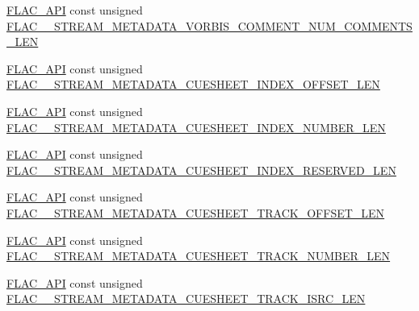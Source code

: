 \begin{DoxyCompactItemize}
\item 
\mbox{\hyperlink{group__flac__export_ga56ca07df8a23310707732b1c0007d6f5}{F\+L\+A\+C\+\_\+\+A\+PI}} const unsigned \mbox{\hyperlink{group__flac__format_gaa45c45967901bd6002d2a0ccbb208e02}{F\+L\+A\+C\+\_\+\+\_\+\+S\+T\+R\+E\+A\+M\+\_\+\+M\+E\+T\+A\+D\+A\+T\+A\+\_\+\+V\+O\+R\+B\+I\+S\+\_\+\+C\+O\+M\+M\+E\+N\+T\+\_\+\+N\+U\+M\+\_\+\+C\+O\+M\+M\+E\+N\+T\+S\+\_\+\+L\+EN}}
\item 
\mbox{\hyperlink{group__flac__export_ga56ca07df8a23310707732b1c0007d6f5}{F\+L\+A\+C\+\_\+\+A\+PI}} const unsigned \mbox{\hyperlink{group__flac__format_ga6579eee01a62ce96e3e243e3bd1ec478}{F\+L\+A\+C\+\_\+\+\_\+\+S\+T\+R\+E\+A\+M\+\_\+\+M\+E\+T\+A\+D\+A\+T\+A\+\_\+\+C\+U\+E\+S\+H\+E\+E\+T\+\_\+\+I\+N\+D\+E\+X\+\_\+\+O\+F\+F\+S\+E\+T\+\_\+\+L\+EN}}
\item 
\mbox{\hyperlink{group__flac__export_ga56ca07df8a23310707732b1c0007d6f5}{F\+L\+A\+C\+\_\+\+A\+PI}} const unsigned \mbox{\hyperlink{group__flac__format_ga1cbe4b28f16dd566feb74782f2728b0e}{F\+L\+A\+C\+\_\+\+\_\+\+S\+T\+R\+E\+A\+M\+\_\+\+M\+E\+T\+A\+D\+A\+T\+A\+\_\+\+C\+U\+E\+S\+H\+E\+E\+T\+\_\+\+I\+N\+D\+E\+X\+\_\+\+N\+U\+M\+B\+E\+R\+\_\+\+L\+EN}}
\item 
\mbox{\hyperlink{group__flac__export_ga56ca07df8a23310707732b1c0007d6f5}{F\+L\+A\+C\+\_\+\+A\+PI}} const unsigned \mbox{\hyperlink{group__flac__format_gaa3266be1c92182925c0d02c660617feb}{F\+L\+A\+C\+\_\+\+\_\+\+S\+T\+R\+E\+A\+M\+\_\+\+M\+E\+T\+A\+D\+A\+T\+A\+\_\+\+C\+U\+E\+S\+H\+E\+E\+T\+\_\+\+I\+N\+D\+E\+X\+\_\+\+R\+E\+S\+E\+R\+V\+E\+D\+\_\+\+L\+EN}}
\item 
\mbox{\hyperlink{group__flac__export_ga56ca07df8a23310707732b1c0007d6f5}{F\+L\+A\+C\+\_\+\+A\+PI}} const unsigned \mbox{\hyperlink{group__flac__format_ga2998481389f82ac8ec3c8aa1e405fb56}{F\+L\+A\+C\+\_\+\+\_\+\+S\+T\+R\+E\+A\+M\+\_\+\+M\+E\+T\+A\+D\+A\+T\+A\+\_\+\+C\+U\+E\+S\+H\+E\+E\+T\+\_\+\+T\+R\+A\+C\+K\+\_\+\+O\+F\+F\+S\+E\+T\+\_\+\+L\+EN}}
\item 
\mbox{\hyperlink{group__flac__export_ga56ca07df8a23310707732b1c0007d6f5}{F\+L\+A\+C\+\_\+\+A\+PI}} const unsigned \mbox{\hyperlink{group__flac__format_ga29c8c5cd71c4cc66ba322e3cf60c78a7}{F\+L\+A\+C\+\_\+\+\_\+\+S\+T\+R\+E\+A\+M\+\_\+\+M\+E\+T\+A\+D\+A\+T\+A\+\_\+\+C\+U\+E\+S\+H\+E\+E\+T\+\_\+\+T\+R\+A\+C\+K\+\_\+\+N\+U\+M\+B\+E\+R\+\_\+\+L\+EN}}
\item 
\mbox{\hyperlink{group__flac__export_ga56ca07df8a23310707732b1c0007d6f5}{F\+L\+A\+C\+\_\+\+A\+PI}} const unsigned \mbox{\hyperlink{group__flac__format_gac3f768f4fa5d8ea1d10a3884c29f4a35}{F\+L\+A\+C\+\_\+\+\_\+\+S\+T\+R\+E\+A\+M\+\_\+\+M\+E\+T\+A\+D\+A\+T\+A\+\_\+\+C\+U\+E\+S\+H\+E\+E\+T\+\_\+\+T\+R\+A\+C\+K\+\_\+\+I\+S\+R\+C\+\_\+\+L\+EN}}

\end{DoxyCompactItemize}
